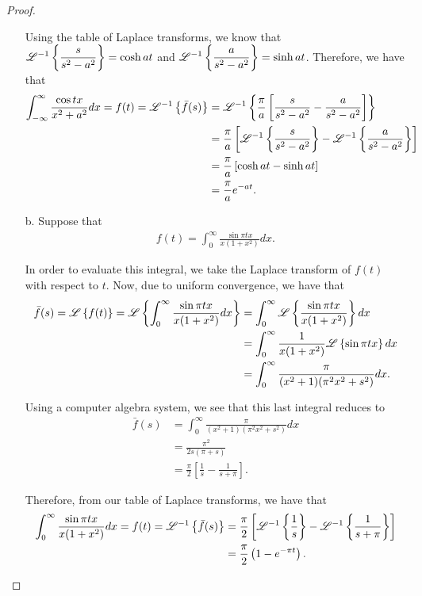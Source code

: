 \begin{proof}
\begin{enumerate}
      Using the table of Laplace transforms, we know that $\displaystyle \mathscr{L}^{-1}\left\{ {\frac{s}{s^2-a^2}} \right\} = \cosh at$
      and $\displaystyle \mathscr{L}^{-1}\left\{ {\frac{a}{s^2-a^2}} \right\} = \sinh at$. Therefore, we have that
      \begin{align*}
        \int_{-\infty}^\infty \frac{\cos tx}{x^2+a^2} dx = f(t) = \mathscr{L}^{-1}\left\{ {\bar{f}(s)} \right\}
        &= \mathscr{L}^{-1}\left\{ {\frac{\pi}{a}\left[\frac{s}{s^2-a^2}-\frac{a}{s^2-a^2}\right]} \right\} \\
        &= \frac{\pi}{a}\left[\mathscr{L}^{-1}\left\{ {\frac{s}{s^2-a^2}} \right\} - \mathscr{L}^{-1}\left\{ {\frac{a}{s^2-a^2}} \right\}\right] \\
        &= \frac{\pi}{a}\left[\cosh at - \sinh at\right] \\
        &= \frac{\pi}{a} e^{-at}.
      \end{align*}

   \item[b.] Suppose that
      \begin{align*}
        f(t) =         \int_0^\infty \frac{ \sin \pi t x}{x(1+x^2)} dx.
      \end{align*}

      In order to evaluate this integral, we take the Laplace transform of $f(t)$ with respect to $t$. Now, due to
      uniform convergence, we have that
      \begin{align*}
        \bar{f}(s) = \mathscr{L}\left\{ {f(t)} \right\} = \mathscr{L}\left\{ {\int_0^\infty \frac{ \sin \pi t x}{x(1+x^2)} dx} \right\}
        &= \int_{0}^\infty \mathscr{L}\left\{ { \frac{ \sin \pi t x}{x(1+x^2)} } \right\} dx \\
        &= \int_{0}^\infty \frac{1}{x(1+x^2)}\mathscr{L}\left\{ {\sin \pi tx} \right\}dx \\
        &= \int_{0}^\infty \frac{\pi}{(x^2 + 1)(\pi^2x^2+s^2)}dx.
      \end{align*}

      Using a computer algebra system, we see that this last integral reduces to
      \begin{align*}
        \bar{f}(s) &= \int_{0}^\infty \frac{\pi}{(x^2 + 1)(\pi^2x^2+s^2)}dx \\
        &= \frac{\pi^2}{2s(\pi + s)} \\
        &= \frac{\pi}{2}\left[\frac{1}{s} - \frac{1}{s+\pi}\right].
      \end{align*}

      Therefore, from our table of Laplace transforms, we have that
      \begin{align*}
        \int_0^\infty \frac{ \sin \pi t x}{x(1+x^2)} dx = f(t) = \mathscr{L}^{-1}\left\{ {\bar{f}(s)} \right\}
        &= \frac{\pi}{2}\left[\mathscr{L}^{-1}\left\{ {\frac{1}{s}} \right\} - \mathscr{L}^{-1}\left\{ {\frac{1}{s+\pi}} \right\}\right] \\
        &= \frac{\pi}{2}\left(1 - e^{-\pi t}\right).
      \end{align*}

  \end{enumerate}
\end{proof}
\newpage
